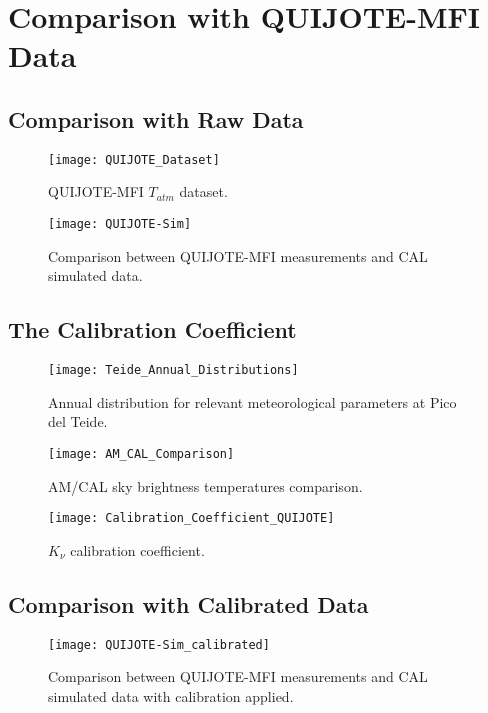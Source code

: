 \chapter{Comparison with QUIJOTE-MFI Data}\label{ch:comparison_quijote}

\section{Comparison with Raw Data}

\begin{figure}
        \centering
        \texttt{[image: QUIJOTE\_Dataset]}
        \caption{QUIJOTE-MFI  $T_{atm}$ dataset.}
        \label{fig:quijote_dataset}
\end{figure}

\begin{figure}
        \centering
        \texttt{[image: QUIJOTE-Sim]}
        \caption{Comparison between QUIJOTE-MFI measurements and CAL
        simulated data.}
        \label{fig:quijote_sim}
\end{figure}

\section{The Calibration Coefficient}

\begin{figure}
        \centering
        \texttt{[image: Teide\_Annual\_Distributions]}
        \caption{Annual distribution for relevant meteorological parameters
        at Pico del Teide.}
        \label{fig:teide_annual_distributions}
\end{figure}

\begin{figure}
        \centering
        \texttt{[image: AM\_CAL\_Comparison]}
        \caption{AM/CAL sky brightness temperatures comparison.}
        \label{fig:am_cal_comparison}
\end{figure}

\begin{figure}
        \centering
        \texttt{[image: Calibration\_Coefficient\_QUIJOTE]}
        \caption{$K_\nu$ calibration coefficient.}
        \label{fig:calibration_coefficient_quijote}
\end{figure}

\section{Comparison with Calibrated Data}

\begin{figure}
        \centering
        \texttt{[image: QUIJOTE-Sim\_calibrated]}
        \caption{Comparison between QUIJOTE-MFI measurements and
        CAL simulated data with calibration applied.}
        \label{fig:quijote_sim_calibrated}
\end{figure}

